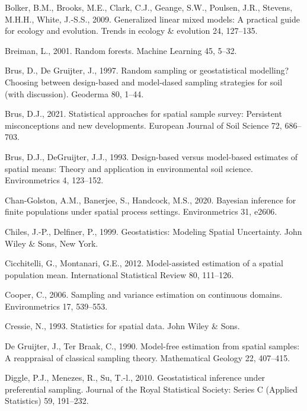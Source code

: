 \documentclass[]{elsarticle} %
\begin{document}
\leavevmode\hypertarget{ref-bolker2009generalized}{}%
Bolker, B.M., Brooks, M.E., Clark, C.J., Geange, S.W., Poulsen, J.R.,
Stevens, M.H.H., White, J.-S.S., 2009. Generalized linear mixed models:
A practical guide for ecology and evolution. Trends in ecology \&
evolution 24, 127--135.

\leavevmode\hypertarget{ref-breiman2001random}{}%
Breiman, L., 2001. Random forests. Machine Learning 45, 5--32.

\leavevmode\hypertarget{ref-brus1997random}{}%
Brus, D., De Gruijter, J., 1997. Random sampling or geostatistical
modelling? Choosing between design-based and model-dased sampling
strategies for soil (with discussion). Geoderma 80, 1--44.

\leavevmode\hypertarget{ref-brus2021statistical}{}%
Brus, D.J., 2021. Statistical approaches for spatial sample survey:
Persistent misconceptions and new developments. European Journal of Soil
Science 72, 686--703.

\leavevmode\hypertarget{ref-brus1993design}{}%
Brus, D.J., DeGruijter, J.J., 1993. Design-based versus model-based
estimates of spatial means: Theory and application in environmental soil
science. Environmetrics 4, 123--152.

\leavevmode\hypertarget{ref-chan2020bayesian}{}%
Chan-Golston, A.M., Banerjee, S., Handcock, M.S., 2020. Bayesian
inference for finite populations under spatial process settings.
Environmetrics 31, e2606.

\leavevmode\hypertarget{ref-chiles1999geostatistics}{}%
Chiles, J.-P., Delfiner, P., 1999. Geostatistics: Modeling Spatial
Uncertainty. John Wiley \& Sons, New York.

\leavevmode\hypertarget{ref-cicchitelli2012model}{}%
Cicchitelli, G., Montanari, G.E., 2012. Model-assisted estimation of a
spatial population mean. International Statistical Review 80, 111--126.

\leavevmode\hypertarget{ref-cooper2006sampling}{}%
Cooper, C., 2006. Sampling and variance estimation on continuous
domains. Environmetrics 17, 539--553.

\leavevmode\hypertarget{ref-cressie1993statistics}{}%
Cressie, N., 1993. Statistics for spatial data. John Wiley \& Sons.

\leavevmode\hypertarget{ref-de1990model}{}%
De Gruijter, J., Ter Braak, C., 1990. Model-free estimation from spatial
samples: A reappraisal of classical sampling theory. Mathematical
Geology 22, 407--415.

\leavevmode\hypertarget{ref-diggle2010geostatistical}{}%
Diggle, P.J., Menezes, R., Su, T.-l., 2010. Geostatistical inference
under preferential sampling. Journal of the Royal Statistical Society:
Series C (Applied Statistics) 59, 191--232.
\end{document}
